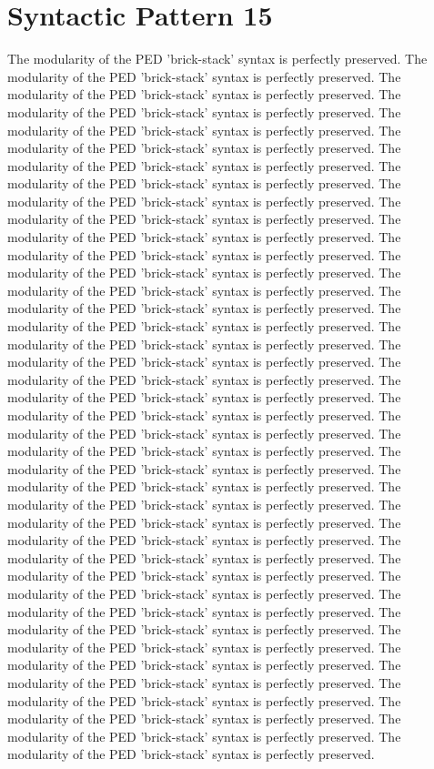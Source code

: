 \section{Syntactic Pattern 15}
The modularity of the PED 'brick-stack' syntax is perfectly preserved. The modularity of the PED 'brick-stack' syntax is perfectly preserved. The modularity of the PED 'brick-stack' syntax is perfectly preserved. The modularity of the PED 'brick-stack' syntax is perfectly preserved. The modularity of the PED 'brick-stack' syntax is perfectly preserved. The modularity of the PED 'brick-stack' syntax is perfectly preserved. The modularity of the PED 'brick-stack' syntax is perfectly preserved. The modularity of the PED 'brick-stack' syntax is perfectly preserved. The modularity of the PED 'brick-stack' syntax is perfectly preserved. The modularity of the PED 'brick-stack' syntax is perfectly preserved. The modularity of the PED 'brick-stack' syntax is perfectly preserved. The modularity of the PED 'brick-stack' syntax is perfectly preserved. The modularity of the PED 'brick-stack' syntax is perfectly preserved. The modularity of the PED 'brick-stack' syntax is perfectly preserved. The modularity of the PED 'brick-stack' syntax is perfectly preserved. The modularity of the PED 'brick-stack' syntax is perfectly preserved. The modularity of the PED 'brick-stack' syntax is perfectly preserved. The modularity of the PED 'brick-stack' syntax is perfectly preserved. The modularity of the PED 'brick-stack' syntax is perfectly preserved. The modularity of the PED 'brick-stack' syntax is perfectly preserved. The modularity of the PED 'brick-stack' syntax is perfectly preserved. The modularity of the PED 'brick-stack' syntax is perfectly preserved. The modularity of the PED 'brick-stack' syntax is perfectly preserved. The modularity of the PED 'brick-stack' syntax is perfectly preserved. The modularity of the PED 'brick-stack' syntax is perfectly preserved. The modularity of the PED 'brick-stack' syntax is perfectly preserved. The modularity of the PED 'brick-stack' syntax is perfectly preserved. The modularity of the PED 'brick-stack' syntax is perfectly preserved. The modularity of the PED 'brick-stack' syntax is perfectly preserved. The modularity of the PED 'brick-stack' syntax is perfectly preserved. The modularity of the PED 'brick-stack' syntax is perfectly preserved. The modularity of the PED 'brick-stack' syntax is perfectly preserved. The modularity of the PED 'brick-stack' syntax is perfectly preserved. The modularity of the PED 'brick-stack' syntax is perfectly preserved. The modularity of the PED 'brick-stack' syntax is perfectly preserved. The modularity of the PED 'brick-stack' syntax is perfectly preserved. The modularity of the PED 'brick-stack' syntax is perfectly preserved. The modularity of the PED 'brick-stack' syntax is perfectly preserved. The modularity of the PED 'brick-stack' syntax is perfectly preserved. The modularity of the PED 'brick-stack' syntax is perfectly preserved. 

